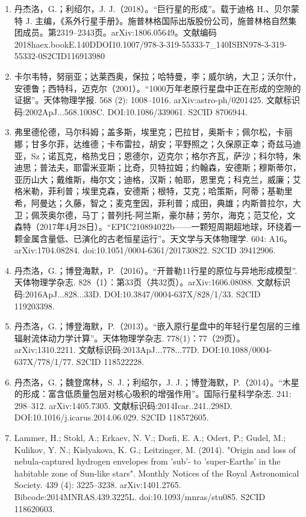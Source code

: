 \begin{enumerate}
\item 丹杰洛，G.；利绍尔，J. J.（2018）。“巨行星的形成”。载于迪格 H.、贝尔蒙特 J. 主编，《系外行星手册》。施普林格国际出版股份公司，施普林格自然集团成员。第2319–2343页。arXiv:1806.05649。文献编码2018haex.bookE.140DDOI10.1007/978-3-319-55333-7_140ISBN978-3-319-55332-0S2CID116913980
\item 卡尔韦特，努丽亚；达莱西奥，保拉；哈特曼，李；威尔纳，大卫；沃尔什，安德鲁；西特科，迈克尔（2001）。“1000万年老原行星盘中正在形成的空隙的证据”。天体物理学报. 568 (2): 1008–1016. arXiv:astro-ph/0201425. 文献标识码:2002ApJ...568.1008C. DOI:10.1086/339061. S2CID 8706944.
\item 弗里德伦德，马尔科姆；盖多斯，埃里克；巴拉甘，奥斯卡；佩尔松，卡丽娜；甘多尔菲，达维德；卡布雷拉，胡安；平野照之；久保原正幸；奇兹马迪亚，Sz；诺瓦克，格热戈日；恩德尔，迈克尔；格尔齐瓦，萨沙；科尔特，朱迪思；普法夫，耶雷米亚斯；比奇，贝特拉姆；约翰森，安德斯；穆斯蒂尔，亚历山大；戴维斯，梅尔文；迪格，汉斯；帕耶，恩里克；科克兰，威廉；艾格米勒，菲利普；埃里克森，安德斯；根特，艾克；哈策斯，阿蒂；基勒里希，阿曼达；久藤，智之；麦克奎因，菲利普；成田，典雄；内斯普拉尔，大卫；佩茨奥尔德，马丁；普列托-阿兰斯，豪尔赫；劳尔，海克；范艾伦，文森特（2017年4月28日）。“EPIC210894022b——一颗短周期超地球，环绕着一颗金属含量低、已演化的古老恒星运行”。天文学与天体物理学. 604: A16。arXiv:1704.08284. doi:10.1051/0004-6361/201730822. S2CID 39412906.
\item 丹杰洛，G.；博登海默，P.（2016）。“开普勒11行星的原位与异地形成模型”. 天体物理学杂志. 828（1）：第33页（共32页）。arXiv:1606.08088. 文献标识码:2016ApJ...828...33D. DOI:10.3847/0004-637X/828/1/33. S2CID 119203398.
\item 丹杰洛，G.；博登海默，P.（2013）。“嵌入原行星盘中的年轻行星包层的三维辐射流体动力学计算”。天体物理学杂志. 778(1)：77（29页）。arXiv:1310.2211. 文献标识码:2013ApJ...778...77D. DOI:10.1088/0004-637X/778/1/77. S2CID 118522228.
\item 丹杰洛，G.；魏登席林，S. J.；利绍尔，J. J.；博登海默，P.（2014）。“木星的形成：富含低质量包层对核心吸积的增强作用”。国际行星科学杂志. 241: 298–312. arXiv:1405.7305. 文献标识码:2014Icar..241..298D. DOI:10.1016/j.icarus.2014.06.029. S2CID 118572605.
\item Lammer, H.; Stokl, A.; Erkaev, N. V.; Dorfi, E. A.; Odert, P.; Gudel, M.; Kulikov, Y. N.; Kislyakova, K. G.; Leitzinger, M. (2014). "Origin and loss of nebula-captured hydrogen envelopes from 'sub'- to 'super-Earths' in the habitable zone of Sun-like stars". Monthly Notices of the Royal Astronomical Society. 439 (4): 3225–3238. arXiv:1401.2765. Bibcode:2014MNRAS.439.3225L. doi:10.1093/mnras/stu085. S2CID 118620603.

\end{enumerate}
